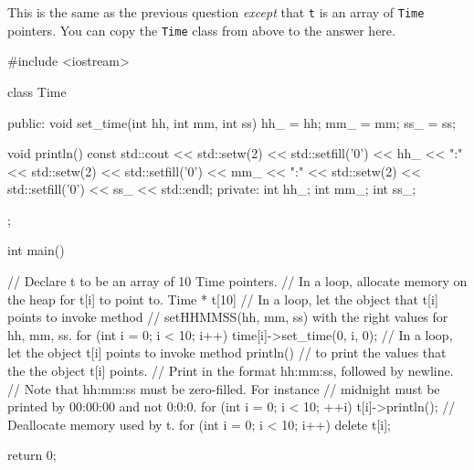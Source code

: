 \nextq
This is the same as the previous question \textit{except}
that \verb!t! is an array of \verb!Time! pointers.
You can copy the \verb!Time! class from above to the answer here.
\\
\ANSWER
\begin{answercode}
#include <iostream>

class Time
{
public:
void set_time(int hh, int mm, int ss)
{
  hh_ = hh;
  mm_ = mm;
  ss_ = ss;
}

void println() const
{
  std::cout << std::setw(2) << std::setfill('0') << hh_ << ":"
  << std::setw(2) << std::setfill('0') << mm_ << ":"
  << std::setw(2) << std::setfill('0') << ss_ << std::endl;
}
private:
int hh_;
int mm_;
int ss_;
};

int main()
{
    // Declare t to be an array of 10 Time pointers.
    // In a loop, allocate memory on the heap for t[i] to point to.
    Time * t[10]
    // In a loop, let the object that t[i] points to invoke method
    // setHHMMSS(hh, mm, ss) with the right values for hh, mm, ss.
    for (int i = 0; i < 10; i++)
    {
      time[i]->set_time(0, i, 0);
    }
    // In a loop, let the object t[i] points to invoke method println()
    // to print the values that the the object t[i] points.
    // Print in the format hh:mm:ss, followed by newline.
    // Note that hh:mm:ss must be zero-filled. For instance
    // midnight must be printed by 00:00:00 and not 0:0:0.
    for (int i = 0; i < 10; ++i)
    {
      t[i]->println();
    }
    // Deallocate memory used by t.
    for (int i = 0; i < 10; i++)
    {
      delete t[i];
    }
    
    return 0;
}

\end{answercode}

